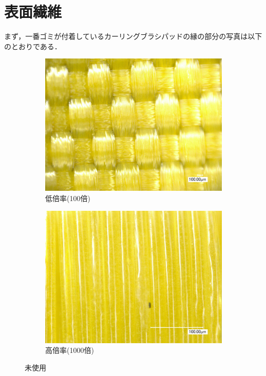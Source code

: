 \documentclass[main]{subfiles}
\begin{document}
\section{表面繊維}

まず，一番ゴミが付着しているカーリングブラシパッドの縁の部分の写真は以下のとおりである．


\begin{figure}[H]
    \centering
    \begin{subfigure}[htbp]{0.45\linewidth}
        \centering
        \includegraphics[keepaspectratio, width=0.8\linewidth]{figures/縁/カーリングパッド未使用低倍率.jpg}
        \caption{低倍率(100倍)}
        \label{fig:label}
    \end{subfigure}
    \begin{subfigure}[htbp]{0.45\linewidth}
        \centering
        \includegraphics[keepaspectratio, width=0.8\linewidth]{figures/縁/カーリングパッド未使用.jpg}
        \caption{高倍率(1000倍)}
        \label{fig:label}
    \end{subfigure}
    \caption{未使用}
    \label{fig:1}
\end{figure}
\end{document}
